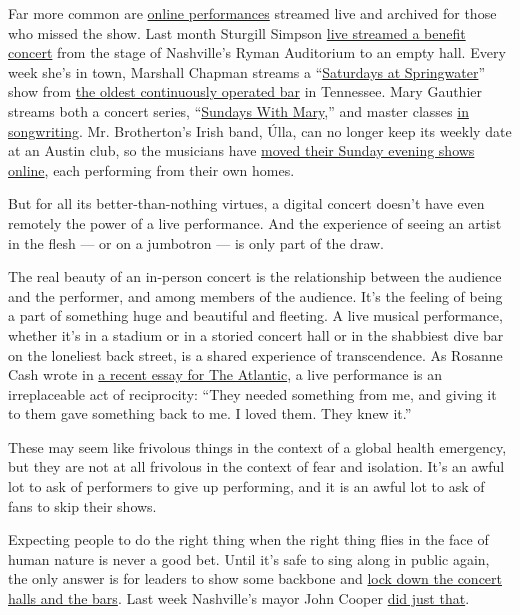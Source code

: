 Far more common are
\href{https://www.vulture.com/2020/05/all-musicians-streaming-live-concerts.html}{online
performances} streamed live and archived for those who missed the show.
Last month Sturgill Simpson
\href{https://www.nashvillescene.com/music/spin/article/21136475/sturgill-simpson-lets-the-grass-grow-at-the-ryman}{live
streamed a benefit concert} from the stage of Nashville's Ryman
Auditorium to an empty hall. Every week she's in town, Marshall Chapman
streams a
``\href{https://www.facebook.com/pg/marshallchapmanmusic/events/}{Saturdays
at Springwater}'' show from \href{https://www.thespringwater.com/}{the
oldest continuously operated bar} in Tennessee. Mary Gauthier streams
both a concert series,
``\href{https://www.marygauthier.com/tour}{Sundays With Mary},'' and
master classes \href{https://www.marygauthier.com/masterclass}{in
songwriting}. Mr. Brotherton's Irish band, Úlla, can no longer keep its
weekly date at an Austin club, so the musicians have
\href{https://www.facebook.com/pg/ullairishmusic/posts/?ref=page_internal}{moved
their Sunday evening shows online}, each performing from their own
homes.

But for all its better-than-nothing virtues, a digital concert doesn't
have even remotely the power of a live performance. And the experience
of seeing an artist in the flesh --- or on a jumbotron --- is only part
of the draw.

The real beauty of an in-person concert is the relationship between the
audience and the performer, and among members of the audience. It's the
feeling of being a part of something huge and beautiful and fleeting. A
live musical performance, whether it's in a stadium or in a storied
concert hall or in the shabbiest dive bar on the loneliest back street,
is a shared experience of transcendence. As Rosanne Cash wrote in
\href{https://www.theatlantic.com/ideas/archive/2020/05/what-pandemic-has-clarified-me-about-life-road/612076/}{a
recent essay for The Atlantic}, a live performance is an irreplaceable
act of reciprocity: ``They needed something from me, and giving it to
them gave something back to me. I loved them. They knew it.''

These may seem like frivolous things in the context of a global health
emergency, but they are not at all frivolous in the context of fear and
isolation. It's an awful lot to ask of performers to give up performing,
and it is an awful lot to ask of fans to skip their shows.

Expecting people to do the right thing when the right thing flies in the
face of human nature is never a good bet. Until it's safe to sing along
in public again, the only answer is for leaders to show some backbone
and
\href{https://www.nytimes.com/aponline/2020/07/02/health/bc-us-med-virus-outbreak-bars.html?searchResultPosition=2}{lock
down the concert halls and the bars}. Last week Nashville's mayor John
Cooper
\href{https://wpln.org/post/nashville-backtracks-on-reopening-plan-reverting-to-phase-2/}{did
just that}.

